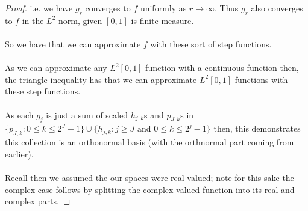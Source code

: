 \documentclass[12pt]{article}
\newenvironment{ex}[2][Exercise]{\begin{trivlist}
\item[\hskip \labelsep {\bfseries #1}\hskip \labelsep {\bfseries #2.}]}{\end{trivlist}}
\begin{document}
\begin{ex}{14}
\begin{enumerate}[label=14.\arabic*]
\begin{proof}
            i.e. we have $g_r$ converges to $f$ uniformly as $r \rightarrow \infty$. Thus $g_r$ also converges to $f$ in the $L^2$ norm, given $[0,1]$ is finite measure. \\ \\
            So we have that we can approximate $f$ with these sort of step functions. \\ \\As we can approximate any $L^2[0,1]$ function with a continuous function then, the triangle inequality has that we can approximate $L^2[0,1]$ functions with these step functions. \\ \\
            As each $g_j$ is just a sum of scaled $h_{j,k}$s and $p_{J,k}$s in $\{p_{J,k} : 0 \leq k \leq 2^J - 1\} \cup \{h_{j, k} : j \geq J \text{ and } 0 \leq k \leq 2^j - 1\}$ then, this demonstrates this collection is an orthonormal basis (with the orthnormal part coming from earlier). \\ \\
            Recall then we assumed the our spaces were real-valued; note for this sake the complex case follows by splitting the complex-valued function into its real and complex parts.
        \end{proof}
    \end{enumerate}
\end{ex}
\end{document}
